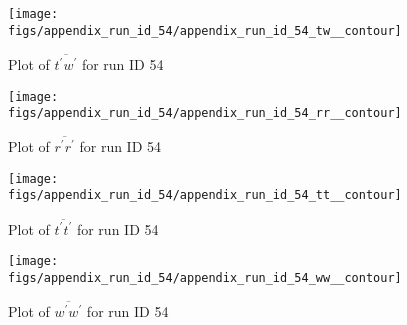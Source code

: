 \begin{figure}[H]
\centering
\texttt{[image: figs/appendix\_run\_id\_54/appendix\_run\_id\_54\_tw\_\_contour]}
\caption{Plot of $\overline{t^\prime w^\prime}$ for run ID 54}
\label{fig:appendix_run_id_54_tw__contour}
\end{figure}


\begin{figure}[H]
\centering
\texttt{[image: figs/appendix\_run\_id\_54/appendix\_run\_id\_54\_rr\_\_contour]}
\caption{Plot of $\overline{r^\prime r^\prime}$ for run ID 54}
\label{fig:appendix_run_id_54_rr__contour}
\end{figure}


\begin{figure}[H]
\centering
\texttt{[image: figs/appendix\_run\_id\_54/appendix\_run\_id\_54\_tt\_\_contour]}
\caption{Plot of $\overline{t^\prime t^\prime}$ for run ID 54}
\label{fig:appendix_run_id_54_tt__contour}
\end{figure}


\begin{figure}[H]
\centering
\texttt{[image: figs/appendix\_run\_id\_54/appendix\_run\_id\_54\_ww\_\_contour]}
\caption{Plot of $\overline{w^\prime w^\prime}$ for run ID 54}
\label{fig:appendix_run_id_54_ww__contour}
\end{figure}


